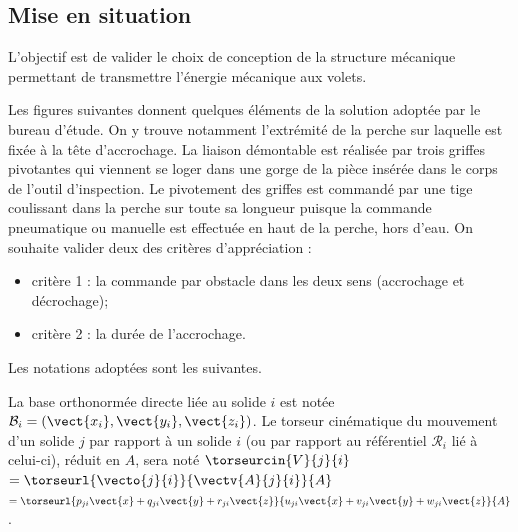 \documentclass[10pt,fleqn]{article} %
\begin{document}

\vspace{4.5cm}
\pagestyle{fancy}
\thispagestyle{plain}


\def\columnseprulecolor{\color{ocre}}
\setlength{\columnseprule}{0.4pt} 

\begin{multicols}{2}
\section*{Mise en situation}






\begin{obj}
L'objectif est de valider le choix de conception de la structure mécanique permettant
de transmettre l'énergie mécanique aux volets.
\end{obj}

Les figures suivantes donnent quelques éléments de la solution adoptée par le bureau d'étude. On y
trouve notamment l'extrémité de la perche sur laquelle est fixée à la tête d'accrochage. La liaison démontable est
réalisée par trois griffes pivotantes qui viennent se loger dans une gorge de la pièce insérée dans le corps de
l'outil d'inspection. Le pivotement des griffes est commandé par une tige coulissant dans la perche sur toute sa
longueur puisque la commande pneumatique ou manuelle est effectuée en haut de la perche, hors d'eau.
On souhaite valider deux des critères d'appréciation :
\begin{itemize}
\item critère 1 : la commande par obstacle dans les deux sens (accrochage et décrochage);
\item critère 2 : la durée de l'accrochage.
\end{itemize}

Les notations adoptées sont les suivantes.

La base orthonormée directe liée au solide $i$  est notée $\mathcal{B}_i = \left(\vect{x_i},\vect{y_i},\vect{z_i}\right)$. Le torseur cinématique du mouvement d’un solide $j$ par rapport à un solide $i$
(ou par rapport au référentiel $\mathcal{R}_i$ lié à celui-ci), réduit en $A$, sera noté $\torseurcin{V}{j}{i}$ $=\torseurl{\vecto{j}{i}}{\vectv{A}{j}{i}}{A}$ $=\torseurl{p_{ji} \vect{x}+q_{ji}\vect{y}+r_{ji}\vect{z}}{u_{ji} \vect{x}+v_{ji}\vect{y}+w_{ji}\vect{z}}{A}$.%


\end{multicols}
\end{document}
